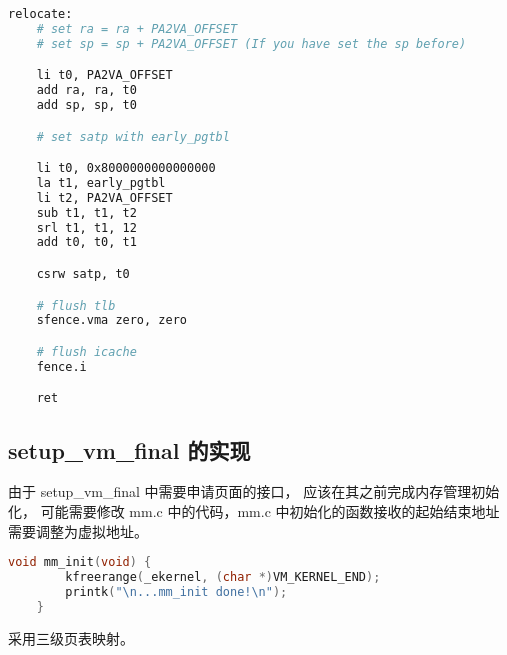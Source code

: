 \documentclass{source/Report}
\begin{document}
\begin{lstlisting}[language = bash, title = {relocate}]
    relocate:
    # set ra = ra + PA2VA_OFFSET
    # set sp = sp + PA2VA_OFFSET (If you have set the sp before)

    li t0, PA2VA_OFFSET
    add ra, ra, t0
    add sp, sp, t0

    # set satp with early_pgtbl

    li t0, 0x8000000000000000
    la t1, early_pgtbl
    li t2, PA2VA_OFFSET
    sub t1, t1, t2
    srl t1, t1, 12
    add t0, t0, t1

    csrw satp, t0

    # flush tlb
    sfence.vma zero, zero

    # flush icache
    fence.i

    ret
\end{lstlisting}


\subsection{setup\_vm\_final 的实现}

由于 setup\_vm\_final 中需要申请页面的接口， 应该在其之前完成内存管理初始化， 可能需要修改 mm.c 中的代码，mm.c 中初始化的函数接收的起始结束地址需要调整为虚拟地址。

\begin{lstlisting}[language = c, title = {mm\_init}]
    void mm_init(void) {
        kfreerange(_ekernel, (char *)VM_KERNEL_END);
        printk("\n...mm_init done!\n");
    }
\end{lstlisting}

采用三级页表映射。    
\end{document}
